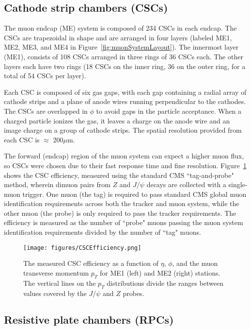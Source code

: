 \subsection{Cathode strip chambers (CSCs)}

The muon endcap (ME) system is composed of 234 CSCs in each endcap. The CSCs are trapezoidal in shape and are arranged in four layers  (labeled ME1, ME2, ME3, and ME4 in Figure~\ref{fig:muonSystemLayout}). The innermost layer (ME1), consists of 108 CSCs arranged in three rings of 36 CSCs each. The other layers each have two rings (18 CSCs on the inner ring, 36 on the outer ring, for a total of 54 CSCs per layer).\cite{Muon}

Each CSC is composed of six gas gaps, with each gap containing a radial array of cathode strips and a plane of anode wires running perpendicular to the cathodes. The CSCs are overlapped in $\phi$ to avoid gaps in the particle acceptance. When a charged particle ionizes the gas, it leaves a charge on the anode wire and an image charge on a group of cathode strips. The spatial resolution provided from each CSC is $\approx$ 200$\mu$m.

The forward (endcap) region of the muon system can expect a higher muon flux, so CSCs were chosen due to their fast response time and fine resolution. Figure~\ref{fig:CSCEfficiency} shows the CSC efficiency, measured using the standard CMS ``tag-and-probe" method, wherein dimuon pairs from $Z$ and $J/\psi$ decays are collected with a single-muon trigger. One muon (the tag) is required to pass standard CMS global muon identification requirements across both the tracker and muon system, while the other muon (the probe) is only required to pass the tracker requirements. The efficiency is measured as the number of ``probe" muons passing the muon system identification requirements divided by the number of ``tag" muons.\cite{Muon}

\begin{figure}\centering
  \texttt{[image: figures/CSCEfficiency.png]}
  \caption{\label{fig:CSCEfficiency} The measured CSC efficiency as a function of $\eta$, $\phi$, and the muon transverse momentum $p_T$ for ME1 (left) and ME2 (right) stations. The vertical lines on the $p_T$ distributions divide the ranges between values covered by the $J/\psi$ and $Z$ probes.}
\end{figure}

\subsection{Resistive plate chambers (RPCs)}

